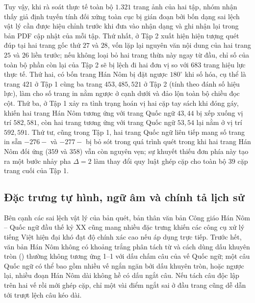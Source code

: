 Tuy vậy, khi rà soát thực tế toàn bộ $1.321$ trang ảnh của hai tập, nhóm nhận thấy giả định tuyến tính đối xứng toàn cục bị gián đoạn bởi bốn dạng sai lệch vật lý cần được hiệu chỉnh trước khi đưa vào nhận dạng và ghi nhận lại trong bản PDF cập nhật của mỗi tập. Thứ nhất, ở Tập 2 xuất hiện hiện tượng quét đúp tại hai trang gốc thứ $27$ và $28$, vốn lặp lại nguyên văn nội dung của hai trang $25$ và $26$ liền trước; nếu không loại bỏ hai trang thừa này ngay từ đầu, chỉ số của toàn bộ phần còn lại của Tập 2 sẽ bị lệch đi hai đơn vị so với $683$ trang hiệu lực thực tế. Thứ hai, có bốn trang Hán Nôm bị đặt ngược $180^\circ$ khi số hóa, cụ thể là trang $421$ ở Tập 1 cùng ba trang $453, 485, 521$ ở Tập 2 (tính theo đánh số hiệu lực), làm cho số trang in nằm ngược ở cạnh dưới và đảo lộn toàn bộ chiều đọc cột. Thứ ba, ở Tập 1 xảy ra tình trạng hoán vị hai cặp tay sách khi đóng gáy, khiến hai trang Hán Nôm tương ứng với trang Quốc ngữ $43, 44$ bị xếp xuống vị trí $582, 581$, còn hai trang tương ứng với trang Quốc ngữ $53, 54$ lại nằm ở vị trí $592, 591$. Thứ tư, cũng trong Tập 1, hai trang Quốc ngữ liên tiếp mang số trang in sẵn $- 276 -$ và $- 277 -$ bị bỏ sót trong quá trình quét trong khi hai trang Hán Nôm đối ứng ($359$ và $358$) vẫn còn nguyên vẹn; sự khuyết thiếu đơn phía này tạo ra một bước nhảy pha $\Delta = 2$ làm thay đổi quy luật ghép cặp cho toàn bộ $39$ cặp trang cuối của Tập 1.

\subsection{Đặc trưng tự hình, ngữ âm và chính tả lịch sử}

Bên cạnh các sai lệch vật lý của bản quét, bản thân văn bản Công giáo Hán Nôm -- Quốc ngữ đầu thế kỷ XX cũng mang nhiều đặc trưng khiến các công cụ xử lý tiếng Việt hiện đại khó đạt độ chính xác cao nếu áp dụng trực tiếp. Trước hết, văn bản Hán Nôm không có khoảng trắng phân tách từ và cách dùng dấu khuyên tròn () thường không tương ứng 1--1 với dấu chấm câu của vế Quốc ngữ; một câu Quốc ngữ có thể bao gồm nhiều vế ngắn ngăn bởi dấu khuyên tròn, hoặc ngược lại, nhiều đoạn Hán Nôm dài không hề có dấu ngắt câu. Nếu tách câu độc lập trên hai vế rồi mới ghép cặp, chỉ một vài điểm ngắt sai ở đầu trang cũng dễ dẫn tới trượt lệch câu kéo dài.

